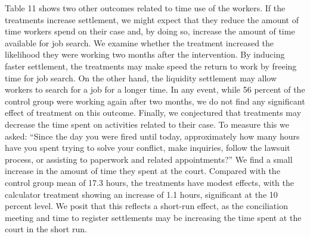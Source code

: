 \documentclass[oneside,12pt]{article}
\begin{document}
Table 11 shows two other outcomes related to time use of the workers. If the treatments increase settlement, we might expect that they reduce the amount of time workers spend on their case and, by doing so, increase the amount of time available for job search. We examine whether the treatment increased the likelihood they were working two months after the intervention. By inducing faster settlement, the treatments may make speed the return to work by freeing time for job search. On the other hand, the liquidity settlement may allow workers to search for a job for a longer time. In any event, while 56 percent of the control group were working again after two months, we do not find any significant effect of treatment on this outcome. Finally, we conjectured that treatments may decrease the time spent on activities related to their case. To measure this we asked: “Since the day you were fired until today, approximately how many hours have you spent trying to solve your conflict, make inquiries, follow the lawsuit process, or assisting to paperwork and related appointments?” We find a small increase in the amount of time they spent at the court. Compared with the control group mean of 17.3 hours, the treatments have modest effects, with the calculator treatment showing an increase of 1.1 hours, significant at the 10 percent level. We posit that this reflects a short-run effect, as the conciliation meeting and time to register settlements may be increasing the time spent at the court in the short run.

\end{document}
